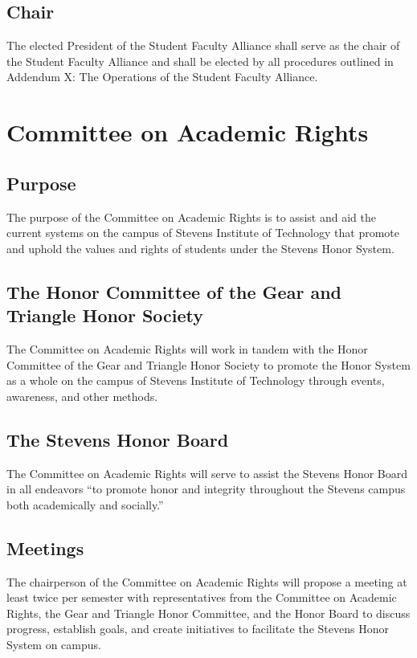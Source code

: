 \documentclass[12pt]{scrreprt}
\begin{document}
\subsection{Chair}
The elected President of the Student Faculty Alliance shall serve as the chair of the
Student Faculty Alliance and shall be elected by all procedures outlined in Addendum
X: The Operations of the Student Faculty Alliance.

\section{Committee on Academic Rights}

\subsection{Purpose}
The purpose of the Committee on Academic Rights is to assist and aid the current
systems on the campus of Stevens Institute of Technology that promote and uphold the
values and rights of students under the Stevens Honor System.

\subsection{The Honor Committee of the Gear and Triangle Honor Society}
The Committee on Academic Rights will work in tandem with the Honor Committee of
the Gear and Triangle Honor Society to promote the Honor System as a whole on the
campus of Stevens Institute of Technology through events, awareness, and other
methods. 

\subsection{The Stevens Honor Board}
The Committee on Academic Rights will serve to assist the Stevens Honor Board in all
endeavors “to promote honor and integrity throughout the Stevens campus both
academically and socially.”

\subsection{Meetings}
The chairperson of the Committee on Academic Rights will propose a meeting at least
twice per semester with representatives from the Committee on Academic Rights, the
Gear and Triangle Honor Committee, and the Honor Board to discuss progress, establish
goals, and create initiatives to facilitate the Stevens Honor System on campus. 
\end{document}

